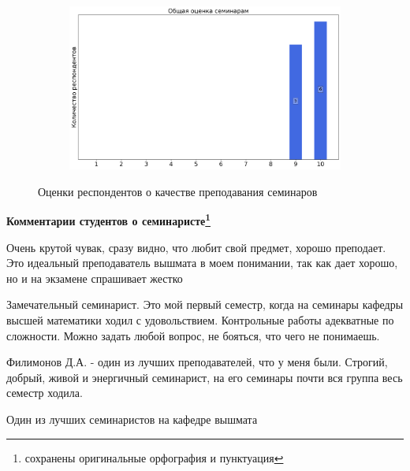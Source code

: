 \begin{figure}[H]
\begin{subfigure}[b]{0.45\textwidth}
			\end{subfigure}
			\begin{subfigure}[b]{0.45\textwidth}
				\centering
				\includegraphics[width=\textwidth]{images/3 course/ТФКП/seminarists-marks-Филимонов Д.А.-3.png}
			\end{subfigure}	
			\caption{Оценки респондентов о качестве преподавания семинаров}
		\end{figure}

		\textbf{Комментарии студентов о семинаристе\protect\footnote{сохранены оригинальные орфография и пунктуация}}
            \begin{commentbox} 
                Очень крутой чувак, сразу видно, что любит свой предмет, хорошо преподает. Это идеальный преподаватель вышмата в моем понимании, так как дает хорошо, но и на экзамене спрашивает жестко 
            \end{commentbox} 
        
            \begin{commentbox} 
                Замечательный семинарист. Это мой первый семестр, когда на семинары кафедры высшей математики ходил с удовольствием. Контрольные работы адекватные по сложности. Можно задать любой вопрос, не бояться, что чего не понимаешь. 
            \end{commentbox} 
        
            \begin{commentbox} 
                Филимонов Д.А. - один из лучших преподавателей, что у меня были. Строгий, добрый, живой и энергичный семинарист, на его семинары почти вся группа весь семестр ходила. 
            \end{commentbox} 
        
            \begin{commentbox} 
                Один из лучших семинаристов на кафедре вышмата 
            \end{commentbox} 
        
